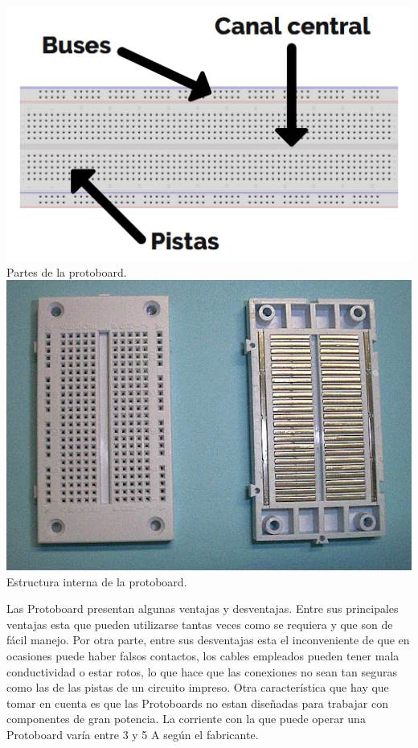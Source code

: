\documentclass[10pt]{article}
\begin{document}
\begin{multicols}{2}
\begin{center}
	\includegraphics[scale = 0.5]{Imagenes/Fotos/Estructura-protoboard.png}\\
	Partes de la protoboard.\\
	\includegraphics[scale = 0.3]{Imagenes/Fotos/ProtoboardInterno.jpg}\\
	Estructura interna de la protoboard.\\
\end{center}

Las Protoboard presentan algunas ventajas y desventajas. Entre sus principales ventajas esta que pueden utilizarse tantas veces como se requiera y que son de fácil manejo. Por otra parte, entre sus desventajas esta el inconveniente de que en ocasiones puede haber falsos contactos, los cables empleados pueden tener mala conductividad o estar rotos, lo que hace que las conexiones no sean tan seguras como las de las pistas de un circuito impreso. Otra característica que hay que tomar en cuenta es que las Protoboards no estan diseñadas para trabajar con componentes de gran potencia.
La corriente con la que puede operar una Protoboard varía entre 3 y 5 A según el fabricante.


\end{multicols}
\end{document}
